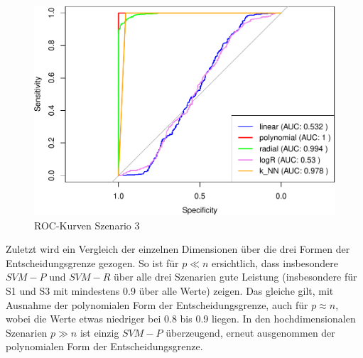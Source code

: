 \documentclass[
]{article}
\begin{document}
\begin{figure}

{\centering \includegraphics{Ergebnisse_files/figure-latex/S3ROC-1} 

}

\caption{ROC-Kurven Szenario 3}\label{fig:S3ROC}
\end{figure}

Zuletzt wird ein Vergleich der einzelnen Dimensionen über die drei
Formen der Entscheidungsgrenze gezogen. So ist für \(p \ll n\)
ersichtlich, dass insbesondere \(SVM-P\) und \(SVM-R\) über alle drei
Szenarien gute Leistung (insbesondere für S1 und S3 mit mindestens 0.9
über alle Werte) zeigen. Das gleiche gilt, mit Ausnahme der polynomialen
Form der Entscheidungsgrenze, auch für \(p \approx n\), wobei die Werte
etwas niedriger bei 0.8 bis 0.9 liegen. In den hochdimensionalen
Szenarien \(p \gg n\) ist einzig \(SVM-P\) überzeugend, erneut
ausgenommen der polynomialen Form der Entscheidungsgrenze.

\printbibliography
\end{document}
